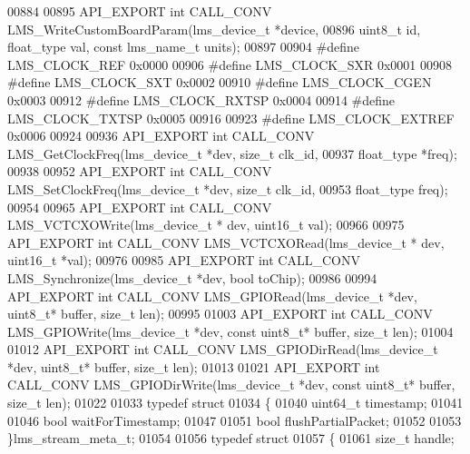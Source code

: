\begin{DoxyCode}
00884 
00895 API_EXPORT \textcolor{keywordtype}{int} CALL_CONV LMS_WriteCustomBoardParam(lms\_device\_t *device,
00896                             uint8\_t \textcolor{keywordtype}{id}, float\_type val, \textcolor{keyword}{const} lms\_name\_t units);
00897 
00904 \textcolor{preprocessor}{#define LMS\_CLOCK\_REF    0x0000  }
00906 \textcolor{preprocessor}{#define LMS\_CLOCK\_SXR    0x0001  }
00908 \textcolor{preprocessor}{#define LMS\_CLOCK\_SXT    0x0002 }
00910 \textcolor{preprocessor}{#define LMS\_CLOCK\_CGEN   0x0003  }
00912 \textcolor{preprocessor}{#define LMS\_CLOCK\_RXTSP  0x0004 }
00914 \textcolor{preprocessor}{#define LMS\_CLOCK\_TXTSP  0x0005 }
00916 
00923 \textcolor{preprocessor}{#define LMS\_CLOCK\_EXTREF 0x0006  }
00924 
00936 API_EXPORT \textcolor{keywordtype}{int} CALL_CONV LMS_GetClockFreq(lms\_device\_t *dev, \textcolor{keywordtype}{size\_t} clk_id,
00937                                          float\_type *freq);
00938 
00952 API_EXPORT \textcolor{keywordtype}{int} CALL_CONV LMS_SetClockFreq(lms\_device\_t *dev, \textcolor{keywordtype}{size\_t} clk_id,
00953                                          float\_type freq);
00954 
00965 API_EXPORT \textcolor{keywordtype}{int} CALL_CONV LMS_VCTCXOWrite(lms\_device\_t * dev, uint16\_t val);
00966 
00975 API_EXPORT \textcolor{keywordtype}{int} CALL_CONV LMS_VCTCXORead(lms\_device\_t * dev, uint16\_t *val);
00976 
00985 API_EXPORT \textcolor{keywordtype}{int} CALL_CONV LMS_Synchronize(lms\_device\_t *dev, \textcolor{keywordtype}{bool} toChip);
00986 
00994 API_EXPORT \textcolor{keywordtype}{int} CALL_CONV LMS_GPIORead(lms\_device\_t *dev, uint8\_t* buffer, \textcolor{keywordtype}{size\_t} 
      len);
00995 
01003 API_EXPORT \textcolor{keywordtype}{int} CALL_CONV LMS_GPIOWrite(lms\_device\_t *dev, \textcolor{keyword}{const} uint8\_t* buffer, \textcolor{keywordtype}{size\_t} 
      len);
01004 
01012 API_EXPORT \textcolor{keywordtype}{int} CALL_CONV LMS_GPIODirRead(lms\_device\_t *dev, uint8\_t* buffer, \textcolor{keywordtype}{size\_t} 
      len);
01013 
01021 API_EXPORT \textcolor{keywordtype}{int} CALL_CONV LMS_GPIODirWrite(lms\_device\_t *dev, \textcolor{keyword}{const} uint8\_t* 
      buffer, \textcolor{keywordtype}{size\_t} len);
01022 
01033 \textcolor{keyword}{typedef} \textcolor{keyword}{struct}
01034 \{
01040     uint64\_t timestamp;
01041 
01046     \textcolor{keywordtype}{bool} waitForTimestamp;
01047 
01051     \textcolor{keywordtype}{bool} flushPartialPacket;
01052 
01053 \}lms_stream_meta_t;
01054 
01056 \textcolor{keyword}{typedef} \textcolor{keyword}{struct}
01057 \{
01061     \textcolor{keywordtype}{size\_t} handle;

\end{DoxyCode}
